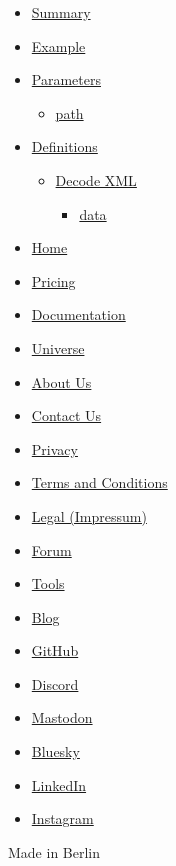 \begin{itemize}
\tightlist
\item
  \hyperref[summary]{Summary}
\item
  \hyperref[example]{Example}
\item
  \hyperref[parameters]{Parameters}

  \begin{itemize}
  \tightlist
  \item
    \hyperref[parameters-path]{path}
  \end{itemize}
\item
  \hyperref[definitions]{Definitions}

  \begin{itemize}
  \tightlist
  \item
    \hyperref[definitions-decode]{Decode XML}

    \begin{itemize}
    \tightlist
    \item
      \hyperref[definitions-decode-data]{data}
    \end{itemize}
  \end{itemize}
\end{itemize}

\begin{itemize}
\tightlist
\item
  \href{/}{Home}
\item
  \href{/pricing/}{Pricing}
\item
  \href{/docs/}{Documentation}
\item
  \href{/universe/}{Universe}
\item
  \href{/about/}{About Us}
\item
  \href{/contact/}{Contact Us}
\item
  \href{/privacy/}{Privacy}
\item
  \href{https://typst.app/terms}{Terms and Conditions}
\item
  \href{/legal/}{Legal (Impressum)}
\end{itemize}

\begin{itemize}
\tightlist
\item
  \href{https://forum.typst.app}{Forum}
\item
  \href{/tools/}{Tools}
\item
  \href{/blog/}{Blog}
\item
  \href{https://github.com/typst/}{GitHub}
\item
  \href{https://discord.gg/2uDybryKPe}{Discord}
\item
  \href{https://mastodon.social/@typst}{Mastodon}
\item
  \href{https://bsky.app/profile/typst.app}{Bluesky}
\item
  \href{https://www.linkedin.com/company/typst/}{LinkedIn}
\item
  \href{https://instagram.com/typstapp/}{Instagram}
\end{itemize}

Made in Berlin
